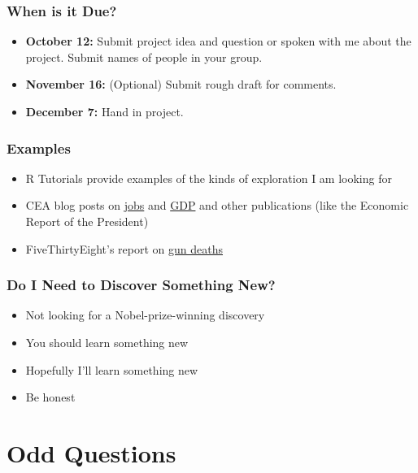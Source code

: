 \documentclass{beamer}
\begin{document}
\begin{frame}
\frametitle{When is it Due?}
    \begin{itemize}
       \item \textbf{October 12:} Submit project idea and question or spoken with me about the project. Submit names of people in your group.

		\item \textbf{November 16:} (Optional) Submit rough draft for comments.

		\item \textbf{December 7:} Hand in project.
    \end{itemize}
\end{frame}

\begin{frame}
\frametitle{Examples}
    \begin{itemize}[<+- | alert@+>]
        	\item R Tutorials provide examples of the kinds of exploration I am looking for
        	\item CEA blog posts on \href{https://www.whitehouse.gov/blog/2016/09/02/employment-situation-august}{jobs} and \href{https://www.whitehouse.gov/blog/2016/08/26/second-estimate-gross-domestic-product-second-quarter-2016}{GDP} and other publications (like the Economic Report of the President)
        	\item FiveThirtyEight's report on \href{http://fivethirtyeight.com/features/gun-deaths/}{gun deaths}
    \end{itemize}
\end{frame}

\begin{frame}
\frametitle{Do I Need to Discover Something New?}
    \begin{itemize}[<+- | alert@+>]
        	\item Not looking for a Nobel-prize-winning discovery
        	\item You should learn something new
        	\item Hopefully I'll learn something new
        	\item Be honest
    \end{itemize}
\end{frame}

\section{Odd Questions}
\end{document}
